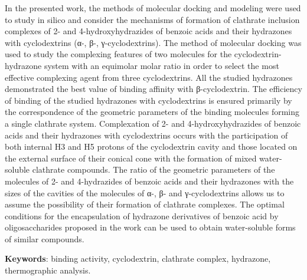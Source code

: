 In the presented work, the methods of molecular docking and modeling
were used to study in silico and consider the mechanisms of formation of
clathrate inclusion complexes of 2- and 4-hydroxyhydrazides of benzoic
acids and their hydrazones with cyclodextrins (α-, β-, γ-cyclodextrins).
The method of molecular docking was used to study the complexing
features of two molecules for the cyclodextrin-hydrazone system with an
equimolar molar ratio in order to select the most effective complexing
agent from three cyclodextrins. All the studied hydrazones demonstrated
the best value of binding affinity with β-cyclodex\-trin. The efficiency
of binding of the studied hydrazones with cyclodextrins is ensured
primarily by the correspondence of the geometric parameters of the
binding molecules forming a single clathrate system. Complexation of 2-
and 4-hydroxyhydrazides of benzoic acids and their hydrazones with
cyclodextrins occurs with the participation of both internal H3 and H5
protons of the cyclodextrin cavity and those located on the external
surface of their conical cone with the formation of mixed water-soluble
clathrate compounds. The ratio of the geometric parameters of the
molecules of 2- and 4-hydrazides of benzoic acids and their hydrazones
with the sizes of the cavities of the molecules of α-, β- and
γ-cyclodextrins allows us to assume the possibility of their formation
of clathrate complexes. The optimal conditions for the encapsulation of
hydrazone derivatives of benzoic acid by oligosaccharides proposed in
the work can be used to obtain water-soluble forms of similar compounds.

{\bfseries Keywords}: binding activity, cyclodextrin, clathrate complex,
hydrazone, thermographic analysis.

